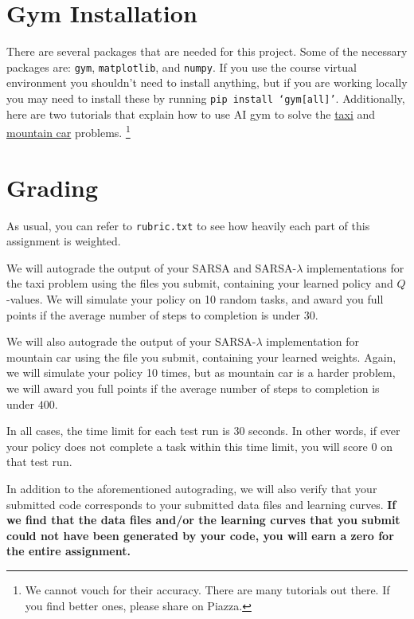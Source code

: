 \documentclass{article}
\newcommand{\amy}[1]{{\color{blue}[Amy: #1]}}
\newcommand{\matt}[1]{{\color{magenta}[Matt: #1]}}
\begin{document}
\section{Gym Installation}
\label{gym}

There are several packages that are needed for this project.  Some of
the necessary packages are: \texttt{gym}, \texttt{matplotlib}, and
\texttt{numpy}.  If you use the course virtual environment you
shouldn't need to install anything, but if you are working locally you
may need to install these by running \texttt{pip install `gym[all]'}.
%
Additionally, here are two tutorials that explain how to use AI gym to
solve the
\href{https://towardsdatascience.com/reinforcement-learning-lets-teach-a-taxi-cab-how-to-drive-4fd1a0d00529}{taxi}
and  
\href{https://towardsdatascience.com/getting-started-with-reinforcement-learning-and-open-ai-gym-c289aca874f}{mountain car}
problems.%
\footnote{We cannot vouch for their accuracy.  There are many tutorials out there.
  If you find better ones, please share on Piazza.}


\section{Grading}
As usual, you can refer to \verb|rubric.txt| to see how heavily each
part of this assignment is weighted.

We will autograde the output of your SARSA and SARSA-$\lambda$
implementations for the taxi problem using the files you submit,
containing your learned policy and $Q$-values.  We will simulate your
policy on 10 random tasks, and award you full points if the average number
of steps to completion is under $30$.

We will also autograde the output of your SARSA-$\lambda$
implementation for mountain car using the file you submit, containing
your learned weights.  Again, we will simulate your policy 10 times,
but as mountain car is a harder problem, we will award you full points
if the average number of steps to completion is under $400$.

In all cases, the time limit for each test run is 30 seconds.  In
other words, if ever your policy does not complete a task within
this time limit, you will score 0 on that test run.

In addition to the aforementioned autograding, we will also verify
that your submitted code corresponds to your submitted data files and
learning curves.  \textbf{If we find that the data files and/or the
  learning curves that you submit could not have been generated by
  your code, you will earn a zero for the entire assignment.}
\end{document}
